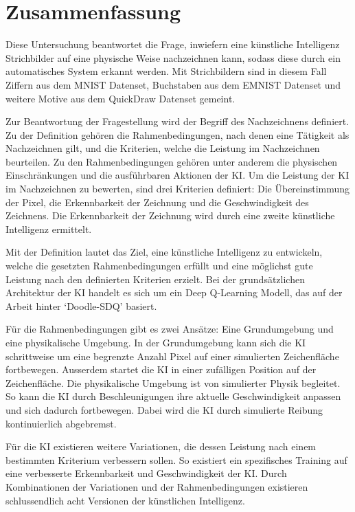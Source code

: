 \chapter{Zusammenfassung}\label{zusammenfassung}
Diese Untersuchung beantwortet die Frage, inwiefern eine künstliche Intelligenz
Strichbilder auf eine physische Weise nachzeichnen kann, sodass diese durch ein
automatisches System erkannt werden. Mit Strichbildern sind in diesem
Fall Ziffern aus dem MNIST Datenset, Buchstaben aus dem EMNIST Datenset und
weitere Motive aus dem QuickDraw Datenset gemeint.
 
Zur Beantwortung der Fragestellung wird der Begriff des Nachzeichnens definiert.
Zu der Definition gehören die Rahmenbedingungen, nach denen eine Tätigkeit als
Nachzeichnen gilt, und die Kriterien, welche die Leistung im Nachzeichnen
beurteilen. Zu den Rahmenbedingungen gehören unter anderem die physischen
Einschränkungen und die ausführbaren Aktionen der KI. Um die Leistung der KI im
Nachzeichnen zu bewerten, sind drei Kriterien definiert: Die Übereinstimmung der
Pixel, die Erkennbarkeit der Zeichnung und die Geschwindigkeit des Zeichnens.
Die Erkennbarkeit der Zeichnung wird durch eine zweite künstliche Intelligenz
ermittelt.
 
Mit der Definition lautet das Ziel, eine künstliche Intelligenz zu entwickeln, welche die gesetzten
Rahmenbedingungen erfüllt und eine möglichst gute Leistung nach den definierten
Kriterien erzielt. Bei der grundsätzlichen Architektur der KI handelt es sich um
ein Deep Q-Learning Modell, das auf der Arbeit hinter `Doodle-SDQ'
\cite{zhou_learning_2018} basiert.
 
Für die Rahmenbedingungen gibt es zwei Ansätze: Eine Grundumgebung und eine
physikalische Umgebung. In der Grundumgebung kann sich die KI schrittweise um
eine begrenzte Anzahl Pixel auf einer simulierten Zeichenfläche fortbewegen.
Ausserdem startet die KI in einer zufälligen Position auf der Zeichenfläche. Die
physikalische Umgebung ist von simulierter Physik begleitet. So kann die KI
durch Beschleunigungen ihre aktuelle Geschwindigkeit anpassen und sich dadurch
fortbewegen. Dabei wird die KI durch simulierte Reibung kontinuierlich
abgebremst.
 
Für die KI existieren weitere Variationen, die dessen Leistung nach einem
bestimmten Kriterium verbessern sollen. So existiert ein spezifisches Training
auf eine verbesserte Erkennbarkeit und Geschwindigkeit der KI. Durch
Kombinationen der Variationen und der Rahmenbedingungen existieren
schlussendlich acht Versionen der künstlichen Intelligenz.
 

